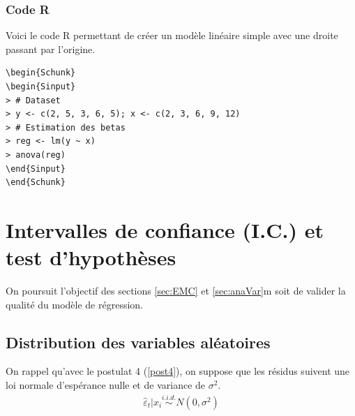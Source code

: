 \documentclass[11pt,french]{report}
\begin{document}
\subsubsection*{Code R}
Voici le code R permettant de créer un modèle linéaire simple avec une droite passant par l'origine.

\begin{lstlisting}[linerange=\\begin\{Sinput\}-\\end\{Sinput\},includerangemarker=false, caption = Code source en R pour l'exemple]
\begin{Schunk}
\begin{Sinput}
> # Dataset
> y <- c(2, 5, 3, 6, 5); x <- c(2, 3, 6, 9, 12)
> # Estimation des betas
> reg <- lm(y ~ x)
> anova(reg)
\end{Sinput}
\end{Schunk}
\end{lstlisting}
\bigskip


\section{Intervalles de confiance (I.C.) et test d'hypothèses}
On poursuit l'objectif des sections \ref{sec:EMC} et \ref{sec:anaVar}m soit de valider la qualité du modèle de régression.

\subsection{Distribution des variables aléatoires}
\label{sec:distri}
On rappel qu'avec le postulat 4 (\ref{post4}), on suppose que les résidus suivent une loi normale d'espérance nulle et de variance de $\sigma^2$.
	\begin{align*}
\hat{\varepsilon}_t|x_i \overset{i.i.d.}{\sim} N(0, \sigma^2)
	\end{align*}
\end{document}
